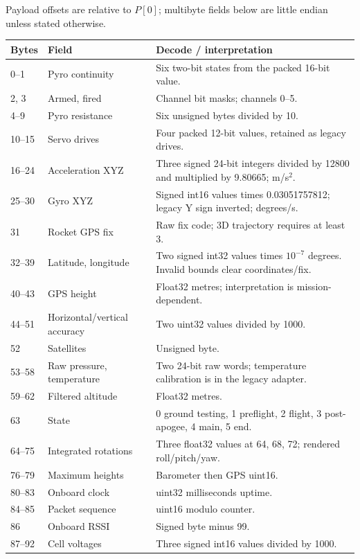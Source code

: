 Payload offsets are relative to \(P[0]\); multibyte fields below are little
endian unless stated otherwise.
\begin{longtable}{@{}L{.14\linewidth}L{.31\linewidth}L{.48\linewidth}@{}}
\toprule Bytes & Field & Decode / interpretation \\\midrule{}--1 & Pyro continuity & Six two-bit states from the packed 16-bit value. \\
2, 3 & Armed, fired & Channel bit masks; channels 0--5. \\
4--9 & Pyro resistance & Six unsigned bytes divided by 10. \\
10--15 & Servo drives & Four packed 12-bit values, retained as legacy drives. \\
16--24 & Acceleration XYZ & Three signed 24-bit integers divided by 12800 and multiplied by 9.80665; m/s$^2$. \\
25--30 & Gyro XYZ & Signed int16 values times 0.03051757812; legacy Y sign inverted; degrees/s. \\
31 & Rocket GPS fix & Raw fix code; 3D trajectory requires at least 3. \\
32--39 & Latitude, longitude & Two signed int32 values times $10^{-7}$ degrees. Invalid bounds clear coordinates/fix. \\
40--43 & GPS height & Float32 metres; interpretation is mission-dependent. \\
44--51 & Horizontal/vertical accuracy & Two uint32 values divided by 1000. \\
52 & Satellites & Unsigned byte. \\
53--58 & Raw pressure, temperature & Two 24-bit raw words; temperature calibration is in the legacy adapter. \\
59--62 & Filtered altitude & Float32 metres. \\
63 & State & 0 ground testing, 1 preflight, 2 flight, 3 post-apogee, 4 main, 5 end. \\
64--75 & Integrated rotations & Three float32 values at 64, 68, 72; rendered roll/pitch/yaw. \\
76--79 & Maximum heights & Barometer then GPS uint16. \\
80--83 & Onboard clock & uint32 milliseconds uptime. \\
84--85 & Packet sequence & uint16 modulo counter. \\
86 & Onboard RSSI & Signed byte minus 99. \\
87--92 & Cell voltages & Three signed int16 values divided by 1000. \\

\end{longtable}
